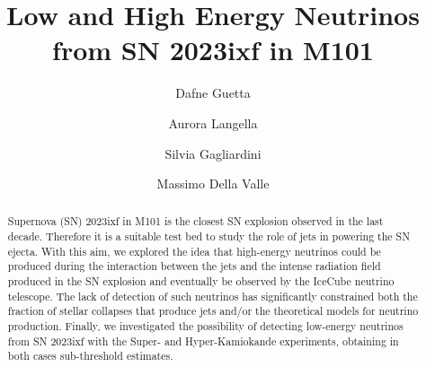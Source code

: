 \documentclass[twocolumn]{aastex631}
\begin{document}
\def\gsim{ \lower .75ex \hbox{$\sim$} \llap{\raise .27ex \hbox{$>$}} }
\def\lsim{ \lower .75ex\hbox{$\sim$} \llap{\raise .27ex \hbox{$<$}} }
\def\clov#1{{\bf[#1 -- Clovis]}}




 
\title{Low and High Energy Neutrinos from SN 2023ixf in M101}


\author{Dafne Guetta}
\author{Aurora Langella}
\author{Silvia Gagliardini}
\author{Massimo Della Valle}


\begin{abstract}

Supernova (SN) 2023ixf in M101 is the closest SN explosion observed in the last decade. Therefore it is a suitable test bed to study the role of jets in powering the SN ejecta. With this aim, we explored the idea that high-energy neutrinos could be produced during the interaction between the jets and the intense radiation field produced in the SN explosion and eventually be observed by the IceCube neutrino telescope. The lack of detection of such neutrinos has significantly constrained both the fraction of stellar collapses that produce jets and/or the theoretical models for neutrino production. Finally, we investigated the possibility of detecting low-energy neutrinos from SN 2023ixf with the Super- and Hyper-Kamiokande experiments, obtaining in both cases sub-threshold estimates.
\end{abstract}
\end{document}
